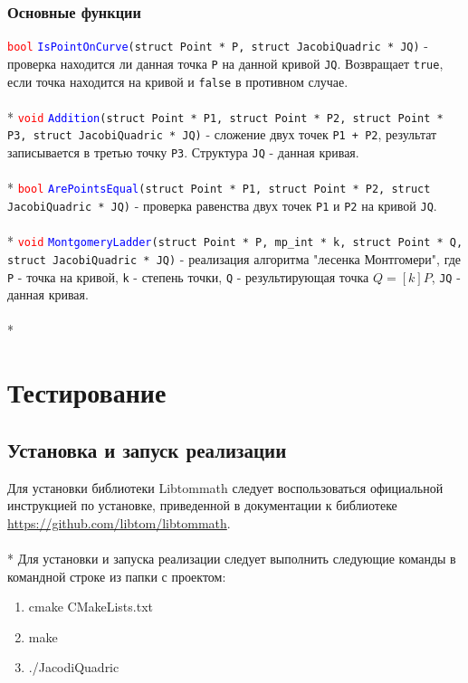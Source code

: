 \documentclass[12pt]{article}
\begin{document}
\subsubsection{Основные функции}
\textcolor{red}{\texttt{bool}} \textcolor{blue}{\texttt{IsPointOnCurve}}\texttt{(struct Point * P, struct JacobiQuadric * JQ)} - проверка находится ли данная точка \texttt{P} на данной кривой \texttt{JQ}. Возвращает \texttt{true}, если точка находится на кривой и \texttt{false} в противном случае.\\
\\*
\textcolor{red}{\texttt{void}} \textcolor{blue}{\texttt{Addition}}\texttt{(struct Point * P1, struct Point * P2, struct Point * P3, struct JacobiQuadric * JQ)} - сложение двух точек \texttt{P1 + P2}, результат записывается в третью точку \texttt{P3}. Структура \texttt{JQ} - данная кривая.\\
\\*
\textcolor{red}{\texttt{bool}} \textcolor{blue}{\texttt{ArePointsEqual}}\texttt{(struct Point * P1, struct Point * P2, struct JacobiQuadric * JQ)} - проверка равенства двух точек \texttt{P1} и \texttt{P2} на кривой \texttt{JQ}.\\
\\*
\textcolor{red}{\texttt{void}} \textcolor{blue}{\texttt{MontgomeryLadder}}\texttt{(struct Point * P, mp\_int * k, struct Point * Q, struct JacobiQuadric * JQ)} - реализация алгоритма "лесенка Монтгомери", где \texttt{P} - точка на кривой, \texttt{k} - степень точки, \texttt{Q} - результирующая точка $Q = [k]P$, \texttt{JQ} - данная кривая.\\
\\*


\section{Тестирование}
\subsection{Установка и запуск реализации}
Для установки библиотеки Libtommath следует воспользоваться официальной инструкцией по установке, приведенной в документации к библиотеке \url{https://github.com/libtom/libtommath}. \\
\\*
Для установки и запуска реализации следует выполнить следующие команды в командной строке из папки с проектом:
\begin{enumerate}
\item cmake CMakeLists.txt
\item make
\item ./JacodiQuadric
\end{enumerate}
\end{document}
